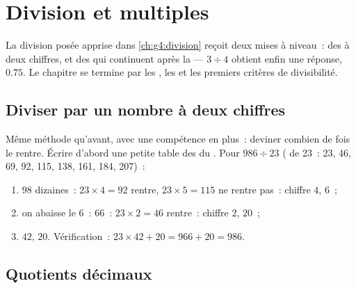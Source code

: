 \chapter{Division et multiples}\label{ch:g5:division}

La division posée apprise dans \cref{ch:g4:division} reçoit deux
mises à niveau~: des  à deux chiffres, et des 
qui continuent après la  --- $3 \div 4$ obtient enfin une
réponse, $0.75$. Le chapitre se termine par les , les
 et les premiers critères de divisibilité.

\section{Diviser par un nombre à deux chiffres}

\begin{method}\label{met:g5:division:twodigits}
Même méthode qu'avant, avec une compétence en plus~: deviner combien
de fois le  rentre. Écrire d'abord une petite table des
 du . Pour $986 \div 23$ ( de 23~: 23,
46, 69, 92, 115, 138, 161, 184, 207)~:
\begin{enumerate}
  \item $98$ dizaines~: $23 \times 4 = 92$ rentre, $23 \times 5 = 115$
        ne rentre pas~: chiffre $4$,  $6$~;
  \item on abaisse le $6$~: $66$~: $23 \times 2 = 46$ rentre~: chiffre
        $2$,  $20$~;
  \item {} $42$,  $20$. Vérification~:
        $23 \times 42 + 20 = 966 + 20 = 986$.
\end{enumerate}
\end{method}

\section{Quotients décimaux}

